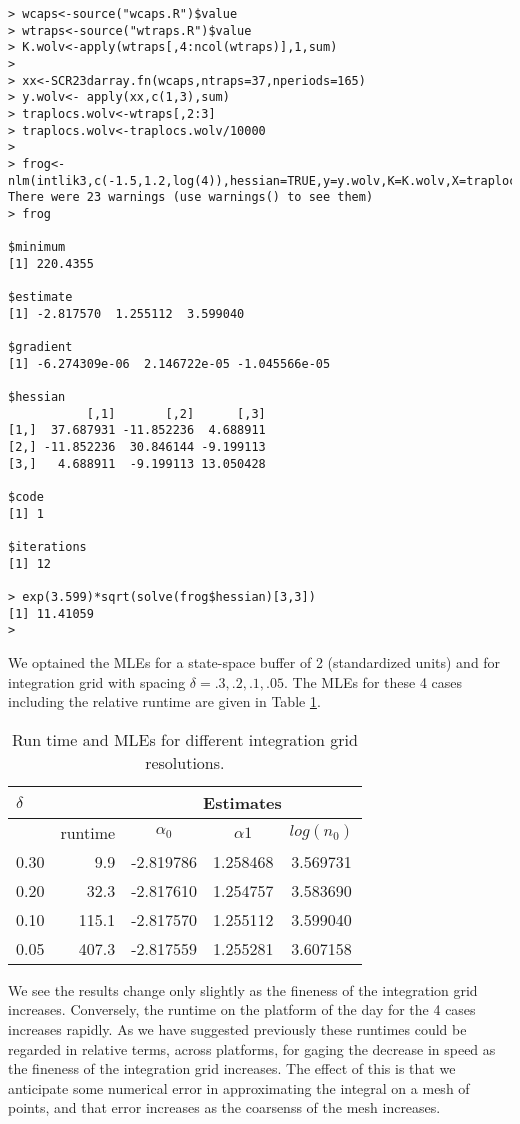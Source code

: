 \begin{verbatim}
> wcaps<-source("wcaps.R")$value
> wtraps<-source("wtraps.R")$value
> K.wolv<-apply(wtraps[,4:ncol(wtraps)],1,sum)
> 
> xx<-SCR23darray.fn(wcaps,ntraps=37,nperiods=165)
> y.wolv<- apply(xx,c(1,3),sum)
> traplocs.wolv<-wtraps[,2:3]
> traplocs.wolv<-traplocs.wolv/10000
>
> frog<-nlm(intlik3,c(-1.5,1.2,log(4)),hessian=TRUE,y=y.wolv,K=K.wolv,X=traplocs.wolv,delta=.1,ssbuffer=2)
There were 23 warnings (use warnings() to see them)
> frog

$minimum
[1] 220.4355

$estimate
[1] -2.817570  1.255112  3.599040

$gradient
[1] -6.274309e-06  2.146722e-05 -1.045566e-05

$hessian
           [,1]       [,2]      [,3]
[1,]  37.687931 -11.852236  4.688911
[2,] -11.852236  30.846144 -9.199113
[3,]   4.688911  -9.199113 13.050428

$code
[1] 1

$iterations
[1] 12

> exp(3.599)*sqrt(solve(frog$hessian)[3,3])
[1] 11.41059
> 

\end{verbatim}

We optained the MLEs for a state-space buffer of 2 (standardized
units) and for integration grid with spacing $\delta = .3, .2, .1,
.05$. The MLEs for these 4 cases including the relative runtime are
given in Table \ref{mle.tab.integration}.

\begin{table}[ht]
\centering
\caption{Run time and MLEs for different integration grid resolutions.}
\begin{tabular}{l|rccc}
\hline \hline
$\delta$ &   & \multicolumn{3}{c}{Estimates} \\ \hline
         &  runtime        & $\alpha_0$ & $\alpha1$ & $log(n_0)$ \\ \hline
 0.30   &  9.9  &  -2.819786 & 1.258468 & 3.569731  \\
 0.20   & 32.3  &  -2.817610 & 1.254757 & 3.583690 \\
 0.10  & 115.1  &  -2.817570 & 1.255112 & 3.599040 \\
 0.05 &  407.3 &   -2.817559&  1.255281&  3.607158 \\
\end{tabular}
\label{mle.tab.integration}
\end{table}


We see the results change only slightly as the fineness of the
integration grid increases. Conversely, the runtime on the platform of
the day for the 4 cases increases rapidly. 
As we have suggested previously these runtimes could be regarded in
relative terms,  across platforms, for gaging the decrease in
speed as the fineness of the integration grid increases. The effect of
this is that we anticipate some numerical error in approximating the
integral on a mesh of points, and that error increases as the
coarsenss of the mesh increases. 


